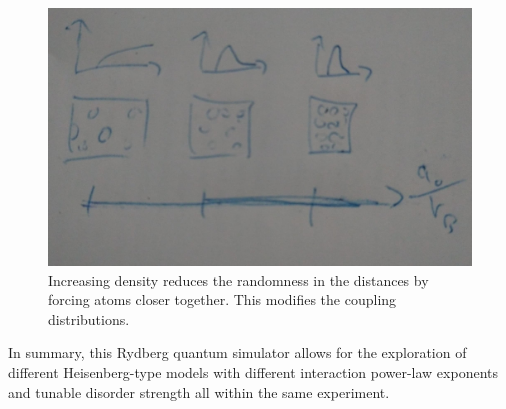\begin{figure}[htb]
	\centering
	\includegraphics[width=\textwidth]{gfx/part1/experimental-disorder-strength.jpeg}
	\caption{Increasing density reduces the randomness in the distances by forcing atoms closer together. This modifies the coupling distributions.}
	\label{fig:disorder-distribution}
\end{figure}

In summary, this Rydberg quantum simulator allows for the exploration of different Heisenberg-type models with different interaction power-law exponents and tunable disorder strength all within the same experiment. 
